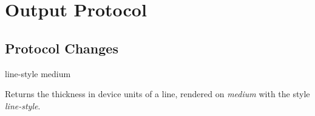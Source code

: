 \chapter{Output Protocol}

\section{Protocol Changes}

 {line-style medium}

Returns the thickness in device units of a line,
rendered on \textit{medium} with the style \textit{line-style}.














